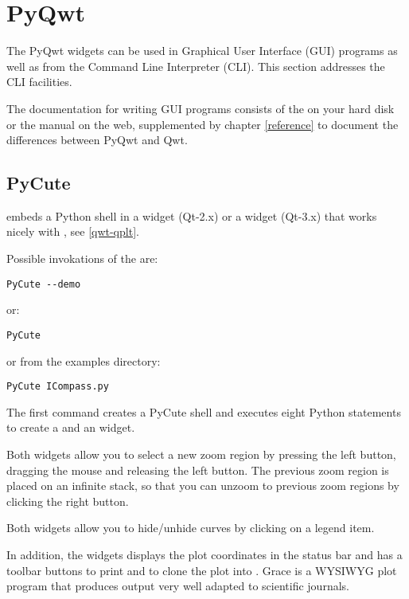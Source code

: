 \documentclass{manual}
\newcommand{\Qwt}{\ulink{Qwt}{http://qwt.sourceforge.net}}
\begin{document}
\section{PyQwt \label{pyqwt-intro}}

The PyQwt widgets can be used in Graphical User Interface (GUI)
programs as well as from the Command Line Interpreter (CLI).
This section addresses the CLI facilities.

The documentation for writing GUI programs consists of the
 on your hard disk or the \Qwt{} manual on
the web, supplemented by chapter \ref{reference} to document the differences
between PyQwt and Qwt.

\subsection{PyCute \label{pycute-intro}}

 embeds a Python shell in a  widget
(Qt-2.x) or a  widget (Qt-3.x) that works nicely with
, see \ref{qwt-qplt}.

Possible invokations of the  are:
\begin{verbatim}
PyCute --demo
\end{verbatim}
or:
\begin{verbatim}
PyCute
\end{verbatim}
or from the examples directory:
\begin{verbatim}
PyCute ICompass.py
\end{verbatim}

The first command creates a PyCute shell and executes eight Python statements
to create a  and an  widget.

Both widgets allow you to select a new zoom region by pressing the left button,
dragging the mouse and releasing the left button.
The previous zoom region is placed on an infinite stack, so that you can
unzoom to previous zoom regions by clicking the right button.

Both widgets allow you to hide/unhide curves by clicking on a legend item.

In addition, the  widgets displays the plot coordinates in the
status bar and has a toolbar buttons to print and to clone the plot into
.
Grace is a WYSIWYG plot program that produces output very well adapted to
scientific journals.
\end{document}
